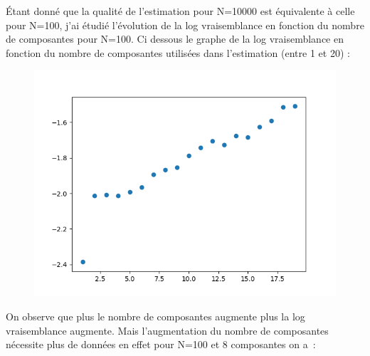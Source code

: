 \documentclass[12pt]{scrartcl} %
\begin{document}
\newline 
Étant donné que la qualité de l'estimation pour N=10000 est équivalente à celle pour N=100, j'ai étudié l'évolution de la log vraisemblance en fonction du nombre de composantes pour N=100. Ci dessous le graphe de la log vraisemblance en fonction du nombre de composantes utilisées dans l'estimation (entre 1 et 20) : 
\newline
\begin{figure}[!h]
 \centering 
\includegraphics[scale=.3]{log100.png}
\end{figure}
\newline 
\newline
\newline
\newline 
\newline
\newline
\newline 
\newline
\newline
\newline 
\newline
\newline
On observe que plus le nombre de composantes  augmente plus la log vraisemblance augmente. Mais l'augmentation du nombre de composantes nécessite plus de données en effet pour N=100 et 8 composantes on a~:
\newline
\end{document}
